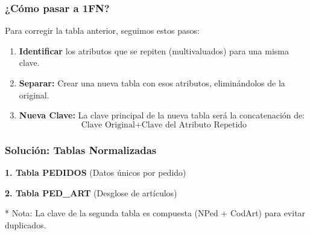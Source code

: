 \documentclass{beamer}
\begin{document}
\begin{frame}
  \frametitle{¿Cómo pasar a 1FN?}

  Para corregir la tabla anterior, seguimos estos pasos:

  \begin{enumerate}
      \item \textbf{Identificar} los atributos que se repiten (multivaluados) para una misma clave.
      \item \textbf{Separar:} Crear una nueva tabla con esos atributos, eliminándolos de la original.
      \item \textbf{Nueva Clave:} La clave principal de la nueva tabla será la concatenación de:
      $$ \text{Clave Original} + \text{Clave del Atributo Repetido} $$
  \end{enumerate}
\end{frame}

\begin{frame}
  \frametitle{Solución: Tablas Normalizadas}

  \textbf{1. Tabla PEDIDOS} (Datos únicos por pedido)
  \begin{center}
  \end{center}

  \textbf{2. Tabla PED\_ART} (Desglose de artículos)
  \begin{center}
  \end{center}
  \tiny{* Nota: La clave de la segunda tabla es compuesta (NPed + CodArt) para evitar duplicados.}
\end{frame}
\end{document}
